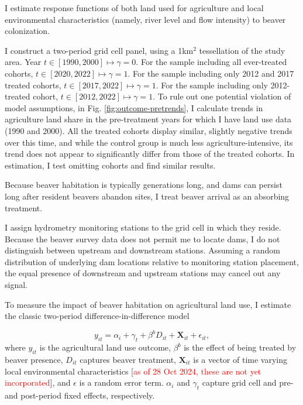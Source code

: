 I estimate response functions of both land used for agriculture and local environmental characteristics (namely, river level and flow intensity) to beaver colonization.

I construct a two-period grid cell panel, using a 1km$^2$ tessellation of the study area. Year $t \in [1990, 2000] \mapsto \gamma = 0$. For the sample including all ever-treated cohorts, $t \in [2020, 2022] \mapsto \gamma = 1$. For the sample including only 2012 and 2017 treated cohorts, $t \in [2017, 2022] \mapsto \gamma = 1$. For the sample including only 2012-treated cohort, $t \in [2012, 2022] \mapsto \gamma = 1$. To rule out one potential violation of model assumptions, in Fig. \ref{fig:outcome-pretrends}, I calculate trends in agriculture land share in the pre-treatment years for which I have land use data (1990 and 2000). All the treated cohorts display similar, slightly negative trends over this time, and while the control group is much less agriculture-intensive, its trend does not appear to significantly differ from those of the treated cohorts. In estimation, I test omitting cohorts and find similar results.

Because beaver habitation is typically generations long, and dams can persist long after resident beavers abandon sites, I treat beaver arrival as an absorbing treatment.

I assign hydrometry monitoring stations to the grid cell in which they reside. Because the beaver survey data does not permit me to locate dams, I do not distinguish between upstream and downstream stations. Assuming a random distribution of underlying dam locations relative to monitoring station placement, the equal presence of downstream and upstream stations may cancel out any signal.


To measure the impact of beaver habitation on agricultural land use, I estimate the classic two-period difference-in-difference model

\begin{equation} \label{eq:main_beaver_eq}
y_{it} = \alpha_i + \gamma_t + \beta^{b}D_{it} + \mathbf{X}_{it} + \epsilon_{it},
\end{equation}
where $y_{it}$ is the agricultural land use outcome, $\beta^b$ is the effect of being treated by beaver presence, $D_{it}$ captures beaver treatment, $\mathbf{X}_{it}$ is a vector of time varying local environmental characteristics [\textcolor{red}{as of 28 Oct 2024, these are not yet incorporated}], and $\epsilon$ is a random error term. $\alpha_i$ and $\gamma_t$ capture grid cell and pre-and post-period fixed effects, respectively. 